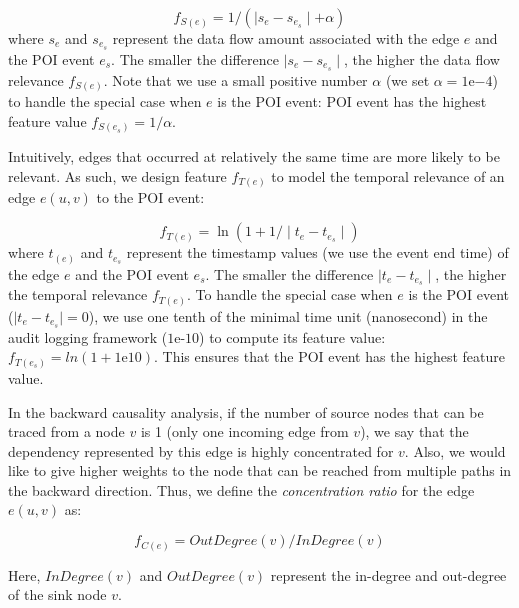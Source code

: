 \begin{equation}
\label{eq:data-feature}
    f_{S(e)} = 1/(\mid s_{e} - s_{e_s}\mid + \alpha)
\end{equation}
where $s_{e}$ and $s_{e_s}$ represent the data 
flow amount associated with the edge $e$ and the POI event $e_s$.
The smaller the difference $\mid s_{e} - s_{e_s}\mid$, the higher the data flow relevance $f_{S(e)}$.
%
Note that we use a small positive number $\alpha$ (we set $\alpha = 1\mathrm{e}{-4}$) to handle the special case when $e$ is the POI event: POI event has the highest feature value $f_{S(e_s)} = 1/\alpha$.


Intuitively, edges that occurred at relatively the same time are more likely to be relevant.
As such, we design feature $f_{T(e)}$ to model the temporal relevance of an edge $e(u,v)$ to the POI event:

\begin{equation}
\label{eq:time-feature}
    f_{T(e)} = \ln(1 + 1/\mid t_{e} - t_{e_s}\mid)
\end{equation}
where $t_{(e)}$ and $t_{e_s}$ represent the timestamp values (we use the event end time) of the edge $e$ and the POI event $e_s$. 
The smaller the difference $\mid t_{e} - t_{e_s}\mid$, the higher the temporal relevance $f_{T(e)}$.
%
To handle the special case when $e$ is the POI event (\ie $\mid t_{e} - t_{e_s}\mid = 0$), we use one tenth of the minimal time unit (nanosecond) in the audit logging framework (\ie $1\mathrm{e}{\mbox{-}10}$) to compute its feature value: $f_{T(e_s)} = ln(1 + 1\mathrm{e}{10})$. 
This ensures that the POI event has the highest feature value.


In the backward causality analysis, if the number of source nodes that can be traced from a node $v$ is 1 (\ie only one incoming edge from $v$), we say that the dependency represented by this edge is highly concentrated for $v$.
Also, we would like to give higher weights to the node that can be reached from multiple paths in the backward direction.
Thus, we define the \emph{concentration ratio} for the edge $e(u, v)$ as:

\begin{equation}
    \label{eq:structure-feature}
    f_{C(e)} = OutDegree(v)/InDegree(v)
\end{equation}
    
Here, $InDegree(v)$ and $OutDegree(v)$ represent the in-degree and out-degree of the sink node $v$.

